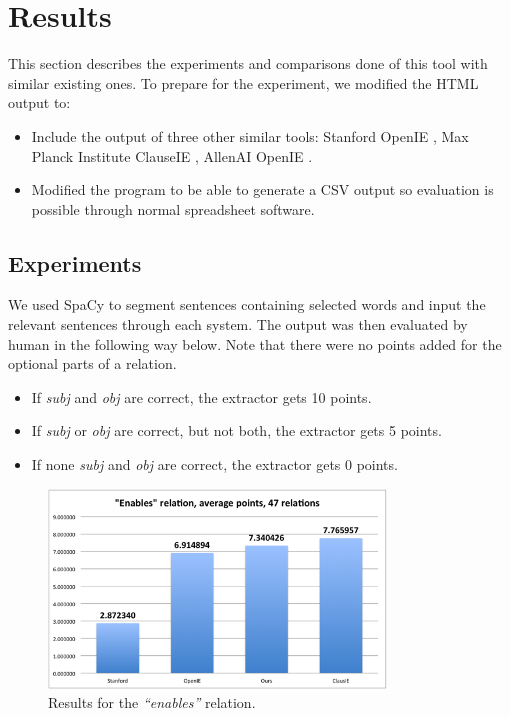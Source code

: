\documentclass[11pt,a4paper,openright]{memoir}
\begin{document}
%
%
%
%

\chapter{Results}
\label{chapter:results}

This section describes the experiments and comparisons done of this tool with similar existing ones. To prepare for the experiment, we modified the HTML output to:
	\begin{itemize}
	  \item Include the output of three other similar tools: Stanford OpenIE \cite{angeli-johnsonpremkumar-manning:2015:ACL-IJCNLP}, Max Planck Institute ClauseIE \cite{DelCorro:2013:CCO:2488388.2488420}, AllenAI OpenIE \cite{Etzioni:2011:OIE:2283396.2283398}.
	  \item Modified the program to be able to generate a CSV output so evaluation is possible through normal spreadsheet software.
	\end{itemize}


\section{Experiments}

We used SpaCy to segment sentences containing selected words and input the relevant sentences through each system. The output was then evaluated by human in the following way below. Note that there were no points added for the optional parts of a relation.

\begin{itemize}
  \item If \emph{subj} and \emph{obj} are correct, the extractor gets 10 points.
  \item If \emph{subj} or \emph{obj} are correct, but not both, the extractor gets 5 points.
  \item If none \emph{subj} and \emph{obj} are correct, the extractor gets 0 points.
\end{itemize}

\begin{figure}[!htbp]
  \centering
    \includegraphics[width=0.8\textwidth]{./images/image001}
  \caption[Results for the \emph{\enquote{enables}} relation.]{Results for the \emph{\enquote{enables}} relation.}
  \label{fig:result_enables}
\end{figure}
\end{document}
